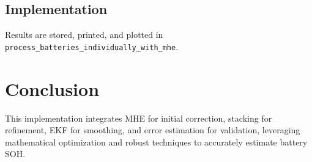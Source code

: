 \subsection{Implementation}
Results are stored, printed, and plotted in \texttt{process\_batteries\_individually\_with\_mhe}.

\section{Conclusion}
This implementation integrates MHE for initial correction, stacking for refinement, EKF for smoothing, and error estimation for validation, leveraging mathematical optimization and robust techniques to accurately estimate battery SOH.
